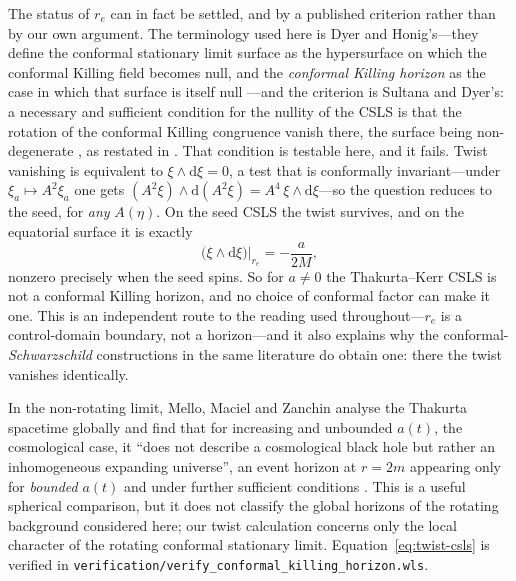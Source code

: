 \documentclass[12pt]{iopart}
\theoremstyle{plain}
\theoremstyle{definition}
\theoremstyle{remark}
\newcommand{\re}{r_{e}}
\newcommand{\dd}{\mathrm{d}}
\begin{document}
The status of $\re$ can in fact be settled, and by a published criterion rather
than by our own argument. The terminology used here is Dyer and
Honig's---they define the conformal stationary limit surface as the hypersurface on
which the conformal Killing field becomes null, and the \emph{conformal Killing
horizon} as the case in which that surface is itself null
\cite{DyerHonig1979}---and the criterion is Sultana and Dyer's: a necessary and
sufficient condition for the nullity of the CSLS is that the rotation of the
conformal Killing congruence vanish there, the surface being non-degenerate
\cite{SultanaDyer2004}, as restated in \cite[\S1]{SultanaDyer2005}. That condition is testable here, and it fails. Twist
vanishing is equivalent to $\xi\wedge\dd\xi=0$, a test that is conformally
invariant---under $\xi_a\mapsto A^2\xi_a$ one gets
$(A^2\xi)\wedge\dd(A^2\xi)=A^4\,\xi\wedge\dd\xi$---so the question reduces to the
seed, for \emph{any} $A(\eta)$. On the seed CSLS the twist survives, and on the
equatorial surface it is exactly
\begin{equation}
    \big(\xi\wedge\dd\xi\big)\big|_{\re}=-\frac{a}{2M} ,
    \label{eq:twist-csls}
\end{equation}
nonzero precisely when the seed spins. So for $a\neq0$ the Thakurta--Kerr CSLS is
not a conformal Killing horizon, and no choice of conformal factor can make it one.
This is an independent route to the reading used throughout---$\re$ is a
control-domain boundary, not a horizon---and it also explains why the
conformal-\emph{Schwarzschild} constructions in the same literature
\cite{SultanaDyer2005} do obtain one: there the twist vanishes identically.

In the non-rotating limit, Mello, Maciel and Zanchin analyse the Thakurta spacetime
globally and find that for increasing and unbounded $a(t)$, the cosmological case, it
``does not describe a cosmological black hole but rather an inhomogeneous expanding
universe'', an event horizon at $r=2m$ appearing only for \emph{bounded} $a(t)$ and
under further sufficient conditions \cite[abstract, \S I]{MelloMaciel2017}. This is a
useful spherical comparison, but it does not classify the global horizons of the
rotating background considered here; our twist calculation concerns only the local
character of the rotating conformal stationary limit.
Equation~\eqref{eq:twist-csls} is verified in
\texttt{verification/verify\_conformal\_killing\_horizon.wls}.
\end{document}
